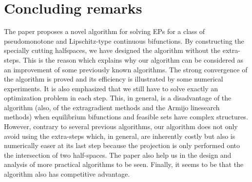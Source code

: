 \documentclass{aims}
\theoremstyle{definition}
\begin{document}
\section{Concluding remarks}
The paper proposes a novel algorithm for solving EPs for a class of pseudomonotone and Lipschitz-type continuous bifunctions. By constructing the specially cutting halfspaces, 
we have designed the algorithm without the extra-steps. This is the reason which explains why our algorithm can be considered as an improvement of  some previously known algorithms. 
The strong convergence of the algorithm is proved and its efficiency is illustrated by some numerical experiments.
It is also emphasized that we still have to solve exactly an optimization problem in each step. This, in general, is a disadvantage of the algorithm 
(also, of the extragradient methods and the Armijo linesearch methods) when 
equilibrium bifunctions and feasible sets have complex structures. However, contrary to several previous algorithms, our algorithm does not only avoid 
using the extra-steps which, in general, are inherently costly but also is numerically easer at its last step because the projection is only performed onto the 
intersection of two half-spaces. The paper also help us in the design and analysis of more practical algorithms to be seen. Finally, it seems to be that the 
algorithm also has competitive advantage.
\end{document}
